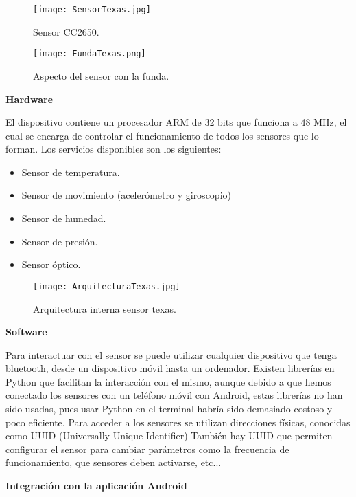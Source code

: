 \documentclass[11pt,spanish]{article}
\begin{document}
\begin{figure}[h!]
  \centering
  \texttt{[image: SensorTexas.jpg]}
  \caption{Sensor CC2650.}
\end{figure}

\begin{figure}[h!]
  \centering
  \texttt{[image: FundaTexas.png]}
  \caption{Aspecto del sensor con la funda.}
\end{figure}
\newpage

{\bf Hardware}
\newline

El dispositivo contiene un procesador ARM de 32 bits que funciona a 48 MHz, el cual se encarga de controlar el funcionamiento de todos los sensores que lo forman. Los servicios disponibles son los siguientes:

\begin{itemize}
  \item Sensor de temperatura.
  \item Sensor de movimiento (acelerómetro y giroscopio)
  \item Sensor de humedad.
  \item Sensor de presión.
  \item Sensor óptico.
\end{itemize}

\begin{figure}[h!]
  \centering
  \texttt{[image: ArquitecturaTexas.jpg]}
  \caption{Arquitectura interna sensor texas.}
\end{figure}
\newpage

{\bf Software}
\newline

Para interactuar con el sensor se puede utilizar cualquier dispositivo que tenga bluetooth, desde un dispositivo móvil hasta un ordenador. Existen librerías en Python que facilitan la interacción con el mismo, aunque debido a que hemos conectado los sensores con un teléfono móvil con Android, estas librerías no han sido usadas, pues usar Python en el terminal habría sido demasiado costoso y poco eficiente. Para acceder a los sensores se utilizan direcciones físicas, conocidas como UUID (Universally Unique Identifier) También hay UUID que permiten configurar el sensor para cambiar parámetros como la frecuencia de funcionamiento, que sensores deben activarse, etc...
\newline

{\bf Integración con la aplicación Android}
\newline
\end{document}
